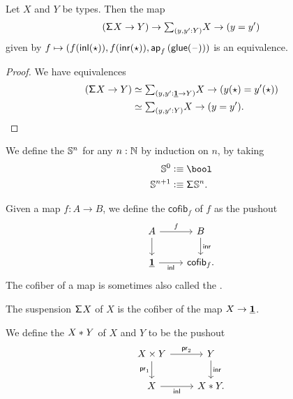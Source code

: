 \begin{lem}
Let $X$ and $Y$ be types. Then the map
\begin{equation*}
(\susp{X}\to Y)\to \sm{y,y':Y} X\to (y=y')
\end{equation*}
given by $f\mapsto (f({\mathsf{inl}}(\star)),f({\mathsf{inr}}(\star)),\mathsf{ap}_{f}\left({\mathsf{glue}(\mathord{\hspace{1pt}\text{--}\hspace{1pt}})}\right))$ is an equivalence.
\end{lem}

\begin{proof}
We have equivalences
\begin{align*}
(\susp{X}\to Y) & \eqvsym \sm{y,y':\unit \to Y} X\to (y(\ttt)=y'(\ttt)) \\
& \eqvsym \sm{y,y':Y} X\to (y=y').\qedhere
\end{align*}
\end{proof}

\begin{defn}
We define the  $\mathbb{S}^{n}$ for any $n:\mathbb{N}$ by induction on $n$, by taking
\begin{align*}
\sphere{0} & \defeq \bool \\
\sphere{n+1} & \defeq \susp{\sphere{n}}.
\end{align*}
\end{defn}

\begin{defn}
Given a map $f:A\to B$, we define the  $\mathsf{cofib}_f$ of $f$ as the pushout
\begin{equation*}
\begin{tikzcd}
A \arrow[r,"f"] \arrow[d] & B \arrow[d,"\inr"] \\
\unit \arrow[r,swap,"\inl"] & \mathsf{cofib}_f. 
\end{tikzcd}
\end{equation*}
The cofiber of a map is sometimes also called the .
\end{defn}

\begin{eg}
The suspension $\mathsf{\Sigma}^{} X$ of $X$ is the cofiber of the map $X\to \underline{\mathbf{1}}$. 
\end{eg}

\begin{defn}
We define the  ${X}\ast_{}{Y}$ of $X$ and $Y$ to be the pushout 
\begin{equation*}
\begin{tikzcd}
X\times Y \arrow[r,"\proj 2"] \arrow[d,swap,"\proj 1"] & Y \arrow[d,"\inr"] \\
X \arrow[r,swap,"\inl"] & X \ast Y. 
\end{tikzcd}
\end{equation*}
\end{defn}

